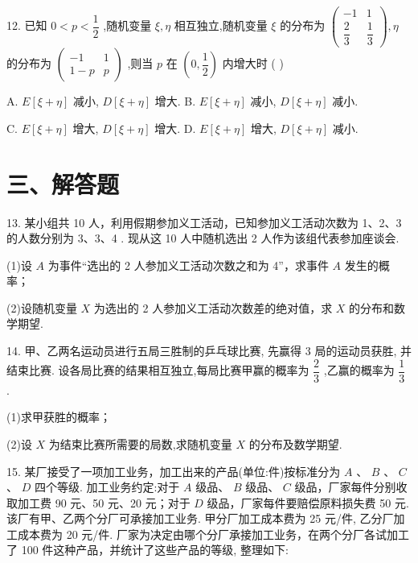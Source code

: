 12. 已知 $0 < p < \dfrac{1}{2}$ ,随机变量 $\xi ,\eta$ 相互独立,随机变量 $\xi$ 的分布为 $\left( \begin{matrix}  - 1 & 1 \\  \dfrac{2}{3} & \dfrac{1}{3} \end{matrix}\right) ,\eta$ 的分布为 $\left( \begin{matrix}  - 1 & 1 \\  1 - p & p \end{matrix}\right)$ ,则当 $p$ 在 $\left( {0,\dfrac{1}{2}}\right)$ 内增大时 ( )

A. $E\left\lbrack  {\xi  + \eta }\right\rbrack$ 减小, $D\left\lbrack  {\xi  + \eta }\right\rbrack$ 增大. B. $E\left\lbrack  {\xi  + \eta }\right\rbrack$ 减小, $D\left\lbrack  {\xi  + \eta }\right\rbrack$ 减小.

C. $E\left\lbrack  {\xi  + \eta }\right\rbrack$ 增大, $D\left\lbrack  {\xi  + \eta }\right\rbrack$ 增大. D. $E\left\lbrack  {\xi  + \eta }\right\rbrack$ 增大, $D\left\lbrack  {\xi  + \eta }\right\rbrack$ 减小.

\section*{三、解答题}

13. 某小组共 10 人，利用假期参加义工活动，已知参加义工活动次数为 1、2、3 的人数分别为 3、3、4 . 现从这 10 人中随机选出 2 人作为该组代表参加座谈会.

(1)设 $A$ 为事件“选出的 2 人参加义工活动次数之和为 4”，求事件 $A$ 发生的概率；

(2)设随机变量 $X$ 为选出的 2 人参加义工活动次数差的绝对值，求 $X$ 的分布和数学期望.

14. 甲、乙两名运动员进行五局三胜制的乒乓球比赛, 先赢得 3 局的运动员获胜, 并结束比赛. 设各局比赛的结果相互独立,每局比赛甲赢的概率为 $\dfrac{2}{3}$ ,乙赢的概率为 $\dfrac{1}{3}$ .

(1)求甲获胜的概率；

(2)设 $X$ 为结束比赛所需要的局数,求随机变量 $X$ 的分布及数学期望.

15. 某厂接受了一项加工业务，加工出来的产品(单位:件)按标准分为 $A$ 、 $B$ 、 $C$ 、 $D$ 四个等级. 加工业务约定:对于 $A$ 级品、 $B$ 级品、 $C$ 级品，厂家每件分别收取加工费 90 元、50 元、20 元；对于 $D$ 级品，厂家每件要赔偿原料损失费 50 元. 该厂有甲、乙两个分厂可承接加工业务. 甲分厂加工成本费为 25 元/件, 乙分厂加工成本费为 20 元/件. 厂家为决定由哪个分厂承接加工业务，在两个分厂各试加工了 100 件这种产品，并统计了这些产品的等级, 整理如下:

